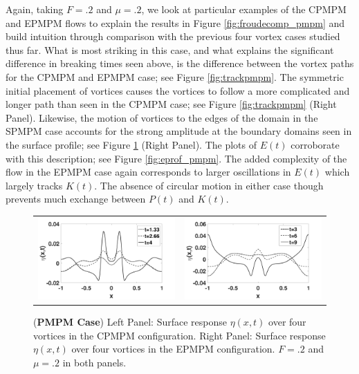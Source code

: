 \documentclass[a4paper,11pt]{article}
\begin{document}
Again, taking $F=.2$ and $\mu=.2$, we look at particular examples of the CPMPM and EPMPM flows to explain the results in Figure \ref{fig:froudecomp_pmpm} and build intuition through comparison with the previous four vortex cases studied thus far.  What is most striking in this case, and what explains the significant difference in breaking times seen above, is the difference between the vortex paths for the CPMPM and EPMPM case; see Figure \ref{fig:trackpmpm}.  The symmetric initial placement of vortices causes the vortices to follow a more complicated and longer path than seen in the CPMPM case; see Figure \ref{fig:trackpmpm} (Right Panel).  Likewise, the motion of vortices to the edges of the domain in the SPMPM case accounts for the strong amplitude at the boundary domains seen in the surface profile; see Figure \ref{fig:surfrepmpm} (Right Panel).  The plots of $E(t)$ corroborate with this description; see Figure \ref{fig:eprof_pmpm}.  The added complexity of the flow in the EPMPM case again corresponds to larger oscillations in $E(t)$ which largely tracks $K(t)$.  The absence of circular motion in either case though prevents much exchange between $P(t)$ and $K(t)$.  
\begin{figure}[!h]
\centering
\begin{tabular}{cc}
\includegraphics[width=.5\textwidth]{surf_resp_mu_pt2_F_pt2_pmpm} & 
\includegraphics[width=.5\textwidth]{surf_resp_mu_pt2_F_pt2_pmpm_sym}
\end{tabular}
\caption{\small ({\bf PMPM Case}) Left Panel: Surface response $\eta(x,t)$ over four vortices in the CPMPM configuration. Right Panel: Surface response $\eta(x,t)$ over four vortices in the EPMPM configuration.  $F=.2$ and $\mu=.2$ in both panels.}
\label{fig:surfrepmpm}
\end{figure}
\end{document}
